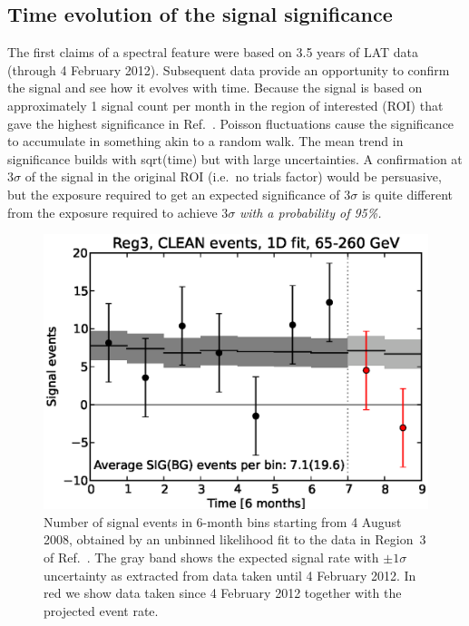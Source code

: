 \documentclass[aps,prd,superscriptaddress,nofootinbib,fixlfloat, 12pt]{revtex4-1}
\begin{document}
\subsection{Time evolution of the signal significance}
The first claims of a spectral feature \citep{Bringmann:2012,Weniger:2012}
were based on 3.5 years of LAT data (through 4 February 2012).  Subsequent
data provide an opportunity to confirm the signal and see how it evolves with
time.  Because the signal is based on approximately 1 signal count per month
in the region of interested (ROI) that gave the highest significance in
Ref.~\cite{Weniger:2012}. Poisson fluctuations cause the significance to accumulate in
something akin to a random walk.  The mean trend in significance builds with
sqrt(time) but with large uncertainties.  A confirmation at $3\sigma$ of the
signal in the original ROI (i.e.~no trials factor) would be persuasive, but
the exposure required to get an expected significance of $3\sigma$ is quite
different from the exposure required to achieve $3\sigma$ \emph{with a
probability of 95\%.}

\begin{figure}[h]
  \begin{center}
    \includegraphics[width=0.60\linewidth]{plots/semester_fluxes.eps}
    \vspace{-0.5cm}
  \end{center}
  \caption{Number of signal events in 6-month bins starting from 4
    August 2008, obtained by an unbinned likelihood fit to the data in
    Region~3 of Ref.~\cite{Weniger:2012}. The gray band shows the expected
    signal rate with $\pm1\sigma$ uncertainty as extracted from data taken until
    4 February 2012.
    In red we show data taken since 4 February 2012
    together with the projected event rate.}
  \label{fig:semester_fluxes}
\end{figure}
\end{document}
